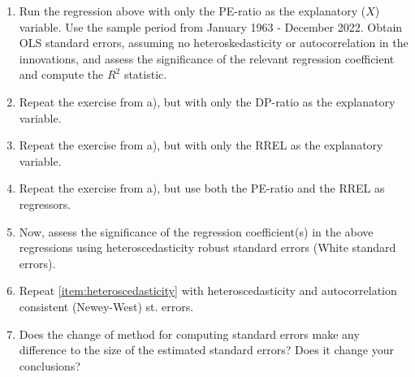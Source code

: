 \begin{enumerate}[label = \alph*)]
    \item Run the regression above with only the PE-ratio as the explanatory (\(X\)) variable. Use the sample period from January 1963 - December 2022. Obtain OLS standard errors, assuming no heteroskedasticity or autocorrelation in the innovations, and assess the significance of the relevant regression coefficient and compute the \(R^2\) statistic.
    \item Repeat the exercise from a), but with only the DP-ratio as the explanatory variable.
    \item Repeat the exercise from a), but with only the RREL as the explanatory variable.
    \item Repeat the exercise from a), but use both the PE-ratio and the RREL as regressors.
    \item\label{item:heteroscedasticity} Now, assess the significance of the regression coefficient(s) in the above regressions using heteroscedasticity robust standard errors (White standard errors).
    \item Repeat \ref{item:heteroscedasticity} with heteroscedasticity and autocorrelation consistent (Newey-West) st. errors.
    \item Does the change of method for computing standard errors make any difference to the size of the estimated standard errors? Does it change your conclusions?
\end{enumerate}